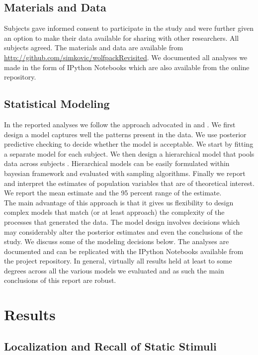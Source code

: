 \documentclass[10pt]{article}
\begin{document}
\subsection*{Materials and Data}
Subjects gave informed consent to participate in the study and were further given an option to make their data available for sharing with other researchers. 
All subjects agreed. 
The materials and data are available from \url{http://github.com/simkovic/wolfpackRevisited}. 
We  documented all analyses we made in the form of IPython Notebooks which are also available from the online repository. 

\subsection*{Statistical Modeling}
In the reported analyses we follow the approach advocated in \cite{gelman07} and \cite{gelman13}. 
We first design a model captures well the patterns present in the data. 
We use posterior predictive checking to decide whether the model is acceptable. 
We start by fitting a separate model for each subject. 
We then design a hierarchical model that pools data across subjects \cite{lee11}. 
Hierarchical models can be easily formulated within bayesian framework and evaluated with sampling algorithms.
Finally we report and interpret the estimates of population variables that are of theoretical interest. We report the mean estimate and the 95 percent range of the estimate.\\
The main advantage of this approach is that it gives us flexibility to design complex models that match (or at least approach) the complexity of the processes that generated the data.
The model design involves decisions which may considerably alter the posterior estimates and even the conclusions of the study.
We discuss some of the modeling decisions below. 
The analyses are documented and can be replicated with the IPython Notebooks available from the project repository.
In general, virtually all results held at least to some degrees across all the various models we evaluated and as such the main conclusions of this report are robust.

\section*{Results}

\subsection*{Localization and Recall of Static Stimuli}
\end{document}
